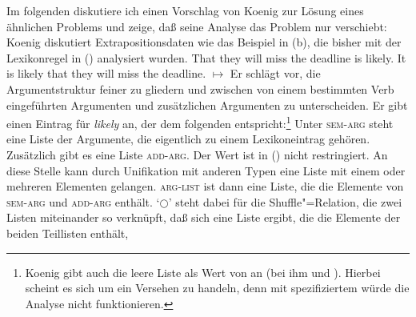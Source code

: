 Im folgenden diskutiere ich einen Vorschlag von Koenig zur Lösung eines ähnlichen Problems
und zeige, daß seine Analyse das Problem nur verschiebt:
Koenig diskutiert Extrapositionsdaten wie das Beispiel in (b), die bisher mit der
Lexikonregel in () analysiert wurden.
\eal
\ex That they will miss the deadline is likely.
\ex It is likely that they will miss the deadline.
\zl
\ea
{} $\mapsto$ %
\z
Er schlägt vor, die Argumentstruktur feiner zu gliedern und zwischen von einem bestimmten
Verb eingeführten Argumenten und zusätzlichen Argumenten zu unterscheiden.
Er gibt einen Eintrag für \emph{likely} an, der dem folgenden entspricht:\footnote{
  Koenig gibt auch die leere Liste als Wert von \subcat an (bei ihm \subj und \comps). Hierbei
  scheint es sich um ein Versehen zu handeln, denn mit spezifiziertem \subcatw
  würde die Analyse nicht funktionieren.%
}
\ea
\label{koenig-likely}
\z
Unter \textsc{sem-arg} steht eine Liste der Argumente, die eigentlich zu einem
Lexikoneintrag gehören. Zusätzlich gibt es eine Liste \textsc{add-arg}. Der Wert
ist in () nicht restringiert. An diese Stelle kann durch Unifikation mit
anderen Typen eine Liste mit einem oder mehreren Elementen gelangen. \textsc{arg-list}
ist dann eine Liste, die die Elemente von \textsc{sem-arg} und \textsc{add-arg} enthält.
`$\bigcirc$'\is{$\bigcirc$}
steht dabei für die Shuffle"=Relation, die zwei Listen miteinander so
verknüpft, daß sich eine Liste ergibt, die die Elemente der beiden Teillisten enthält,
